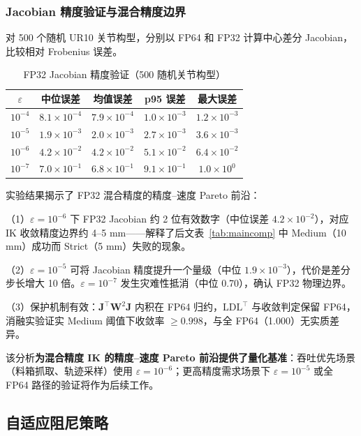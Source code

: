 \documentclass[twocolumn,a4paper,10pt]{ctexart}
\begin{document}
\subsubsection{Jacobian 精度验证与混合精度边界}

对 500 个随机 UR10 关节构型，分别以 FP64 和 FP32 计算中心差分 Jacobian，比较相对 Frobenius 误差。

\begin{table}[ht]
\centering\small
\caption{FP32 Jacobian 精度验证（500 随机关节构型）}
\label{tab:jacobian}
\begin{tabular}{ccccc}
\toprule
$\varepsilon$ & 中位误差 & 均值误差 & p95 误差 & 最大误差 \\
\midrule
$10^{-4}$ & $8.1\times10^{-4}$ & $7.9\times10^{-4}$ & $1.0\times10^{-3}$ & $1.2\times10^{-3}$ \\
$10^{-5}$ & $1.9\times10^{-3}$ & $2.0\times10^{-3}$ & $2.7\times10^{-3}$ & $3.6\times10^{-3}$ \\
$10^{-6}$ & $4.2\times10^{-2}$ & $4.2\times10^{-2}$ & $5.1\times10^{-2}$ & $6.4\times10^{-2}$ \\
$10^{-7}$ & $7.0\times10^{-1}$ & $6.8\times10^{-1}$ & $9.1\times10^{-1}$ & $1.0\times10^{0}$ \\
\bottomrule
\end{tabular}
\end{table}

实验结果揭示了 FP32 混合精度的精度--速度 Pareto 前沿：

（1）$\varepsilon=10^{-6}$ 下 FP32 Jacobian 约 2 位有效数字（中位误差 $4.2\times10^{-2}$），对应 IK 收敛精度边界约 4--5 mm——解释了后文表~\ref{tab:maincomp} 中 Medium（10 mm）成功而 Strict（5 mm）失败的现象。

（2）$\varepsilon=10^{-5}$ 可将 Jacobian 精度提升一个量级（中位 $1.9\times10^{-3}$），代价是差分步长增大 10 倍。$\varepsilon=10^{-7}$ 发生灾难性抵消（中位 0.70），确认 FP32 物理边界。

（3）保护机制有效：$\mathbf{J}^\top\mathbf{W}^2\mathbf{J}$ 内积在 FP64 归约，$\mathrm{LDL}^\top$ 与收敛判定保留 FP64，消融实验证实 Medium 阈值下收敛率 $\ge0.998$，与全 FP64（1.000）无实质差异。

该分析{\bfseries 为混合精度 IK 的精度--速度 Pareto 前沿提供了量化基准}：吞吐优先场景（料箱抓取、轨迹采样）使用 $\varepsilon=10^{-6}$；更高精度需求场景下 $\varepsilon=10^{-5}$ 或全 FP64 路径的验证将作为后续工作。

\subsection{自适应阻尼策略}
\end{document}
